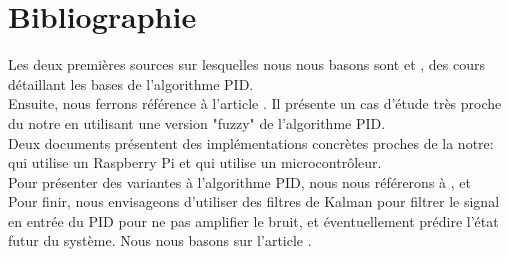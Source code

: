 \documentclass[a4paper,10pt]{article}
\begin{document}
\section{Bibliographie}

Les deux premières sources sur lesquelles nous nous basons sont  \cite{Kinnaert2013} et  \cite{Knospe2006}, des cours détaillant les bases de l'algorithme PID. \\

Ensuite, nous ferrons référence à l'article  \cite{Zheying2014}. Il présente un cas d'étude très proche du notre en utilisant une version "fuzzy" de l'algorithme PID.\\

Deux documents présentent des implémentations concrètes proches de la notre:  \cite{Ioannidis2014} qui utilise un Raspberry Pi et  \cite{ATMEL2005} qui utilise un microcontrôleur. \\

Pour présenter des variantes à l'algorithme PID, nous nous référerons à  \cite{Afou2014},  \cite{ballard1993pid} et  \cite{Saletovi2014} \\

Pour finir, nous envisageons d'utiliser des filtres de Kalman pour filtrer le signal en entrée du PID pour ne pas amplifier le bruit, et éventuellement prédire l'état futur du système. Nous nous basons sur l'article  \cite{Welch2006}.

\newpage

\printbibliography
\end{document}

